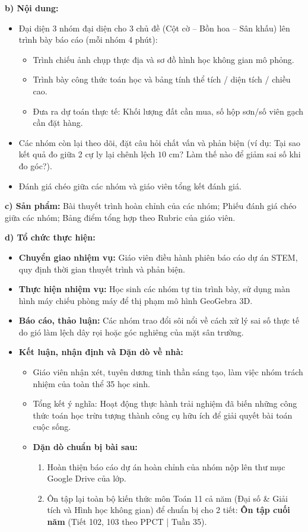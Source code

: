 \documentclass[12pt, a4paper]{article}
\begin{document}
\noindent \textbf{b) Nội dung:}
\begin{itemize}[leftmargin=0.6cm]
    \item Đại diện 3 nhóm đại diện cho 3 chủ đề (Cột cờ -- Bồn hoa -- Sân khấu) lên trình bày báo cáo (mỗi nhóm 4 phút):
    \begin{itemize}
        \item Trình chiếu ảnh chụp thực địa và sơ đồ hình học không gian mô phỏng.
        \item Trình bày công thức toán học và bảng tính thể tích / diện tích / chiều cao.
        \item Đưa ra dự toán thực tế: Khối lượng đất cần mua, số hộp sơn/số viên gạch cần đặt hàng.
    \end{itemize}
    \item Các nhóm còn lại theo dõi, đặt câu hỏi chất vấn và phản biện (ví dụ: Tại sao kết quả đo giữa 2 cự ly lại chênh lệch $10\text{ cm}$? Làm thế nào để giảm sai số khi đo góc?).
    \item Đánh giá chéo giữa các nhóm và giáo viên tổng kết đánh giá.
\end{itemize}

\noindent \textbf{c) Sản phẩm:}
Bài thuyết trình hoàn chỉnh của các nhóm; Phiếu đánh giá chéo giữa các nhóm; Bảng điểm tổng hợp theo Rubric của giáo viên.

\noindent \textbf{d) Tổ chức thực hiện:}
\begin{itemize}[leftmargin=0.6cm]
    \item \textbf{Chuyển giao nhiệm vụ:} Giáo viên điều hành phiên báo cáo dự án STEM, quy định thời gian thuyết trình và phản biện.
    \item \textbf{Thực hiện nhiệm vụ:} Học sinh các nhóm tự tin trình bày, sử dụng màn hình máy chiếu phòng máy để thị phạm mô hình GeoGebra 3D.
    \item \textbf{Báo cáo, thảo luận:} Các nhóm trao đổi sôi nổi về cách xử lý sai số thực tế do gió làm lệch dây rọi hoặc góc nghiêng của mặt sân trường.
    \item \textbf{Kết luận, nhận định và Dặn dò về nhà:}
    \begin{itemize}
        \item Giáo viên nhận xét, tuyên dương tinh thần sáng tạo, làm việc nhóm trách nhiệm của toàn thể 35 học sinh.
        \item Tổng kết ý nghĩa: Hoạt động thực hành trải nghiệm đã biến những công thức toán học trừu tượng thành công cụ hữu ích để giải quyết bài toán cuộc sống.
        \item \textbf{Dặn dò chuẩn bị bài sau:}
        \begin{enumerate}
            \item Hoàn thiện báo cáo dự án hoàn chỉnh của nhóm nộp lên thư mục Google Drive của lớp.
            \item Ôn tập lại toàn bộ kiến thức môn Toán 11 cả năm (Đại số \& Giải tích và Hình học không gian) để chuẩn bị cho 2 tiết: \textbf{Ôn tập cuối năm} (Tiết 102, 103 theo PPCT | Tuần 35).
        \end{enumerate}
    \end{itemize}
\end{itemize}
\end{document}
